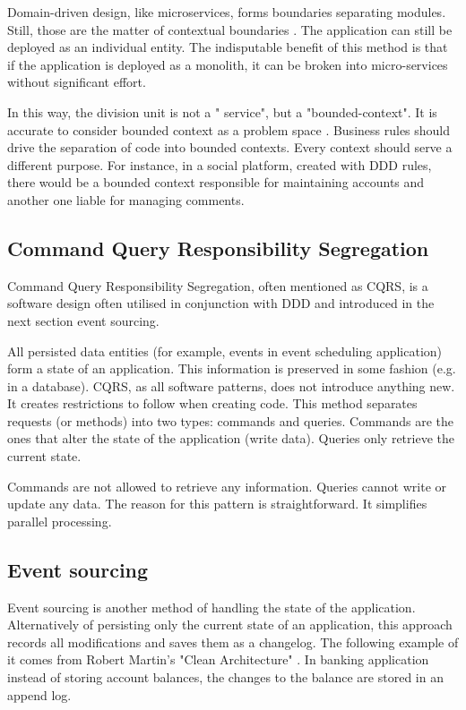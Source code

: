 Domain-driven design, like microservices, forms boundaries separating modules. Still, those are the matter of contextual boundaries \cite{DDD}. The application can still be deployed as an individual entity. The indisputable benefit of this method is that if the application is deployed as a monolith, it can be broken into micro-services without significant effort. 

In this way, the division unit is not a " service", but a "bounded-context". It is accurate to consider bounded context as a problem space \cite{DDD}. Business rules should drive the separation of code into bounded contexts. Every context should serve a different purpose. For instance, in a social platform, created with DDD rules, there would be a bounded context responsible for maintaining accounts and another one liable for managing comments. 


\subsection{Command Query Responsibility Segregation}
\label{subsec:cqrs}

Command Query Responsibility Segregation, often mentioned as CQRS, is a software design often utilised in conjunction with DDD and introduced in the next section event sourcing.

All persisted data entities (for example, events in event scheduling application) form a state of an application. This information is preserved in some fashion (e.g. in a database). CQRS, as all software patterns, does not introduce anything new. It creates restrictions to follow when creating code. This method separates requests (or methods) into two types: commands and queries. Commands are the ones that alter the state of the application (write data). Queries only retrieve the current state. 

Commands are not allowed to retrieve any information. Queries cannot write or update any data. The reason for this pattern is straightforward. It simplifies parallel processing.

\subsection{Event sourcing}
\label{subsec:eventSourcing}

Event sourcing is another method of handling the state of the application. Alternatively of persisting only the current state of an application, this approach records all modifications and saves them as a changelog. The following example of it comes from Robert Martin's "Clean Architecture" \cite{cleanArch}. In banking application instead of storing account balances, the changes to the balance are stored in an append log.

